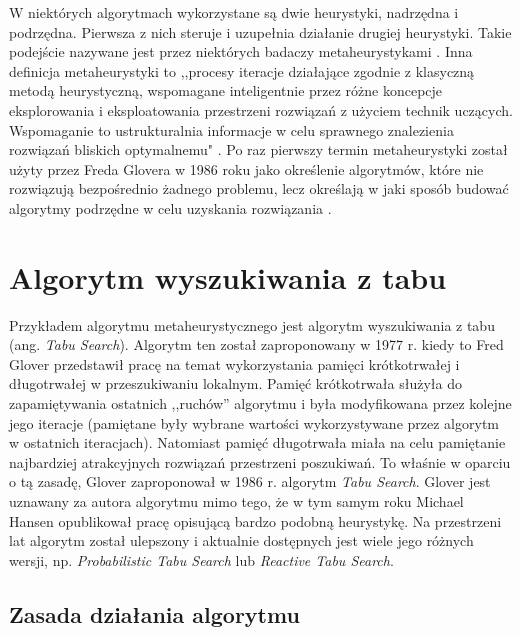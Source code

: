 W niektórych algorytmach wykorzystane są dwie heurystyki, nadrzędna i podrzędna. Pierwsza z nich steruje i uzupełnia działanie drugiej heurystyki. Takie podejście nazywane jest przez niektórych badaczy metaheurystykami \cite{Algorytmy:Widuch}. Inna definicja metaheurystyki to ,,procesy iteracje działające zgodnie z klasyczną metodą heurystyczną, wspomagane inteligentnie przez różne koncepcje eksplorowania i eksploatowania przestrzeni rozwiązań z użyciem technik uczących. Wspomaganie to ustrukturalnia informacje w celu sprawnego znalezienia rozwiązań bliskich optymalnemu" \cite{Metaheurystyki:Osman}. Po raz pierwszy termin metaheurystyki został użyty przez Freda Glovera w 1986 roku jako określenie algorytmów, które nie rozwiązują bezpośrednio żadnego problemu, lecz określają w jaki sposób budować algorytmy podrzędne w celu uzyskania rozwiązania \cite{Future:Glover}.

\section{Algorytm wyszukiwania z tabu}

Przykładem algorytmu metaheurystycznego jest algorytm wyszukiwania z tabu (ang. \textit{Tabu Search}). Algorytm ten został zaproponowany w 1977 r. kiedy to Fred Glover przedstawił pracę na temat wykorzystania pamięci krótkotrwałej i długotrwałej w przeszukiwaniu lokalnym. Pamięć krótkotrwała służyła do zapamiętywania ostatnich ,,ruchów'' algorytmu i była modyfikowana przez kolejne jego iteracje (pamiętane były wybrane wartości wykorzystywane przez algorytm w ostatnich iteracjach). Natomiast pamięć długotrwała miała na celu pamiętanie najbardziej atrakcyjnych rozwiązań przestrzeni poszukiwań. To właśnie w oparciu o tą zasadę, Glover zaproponował w 1986 r. algorytm \textit{Tabu Search}. Glover jest uznawany za autora algorytmu mimo tego, że w tym samym roku Michael Hansen opublikował pracę opisującą bardzo podobną heurystykę. Na przestrzeni lat algorytm został ulepszony i aktualnie dostępnych jest wiele jego różnych wersji, np. \textit{Probabilistic Tabu Search} lub \textit{Reactive Tabu Search}.

\subsection{Zasada działania algorytmu}

